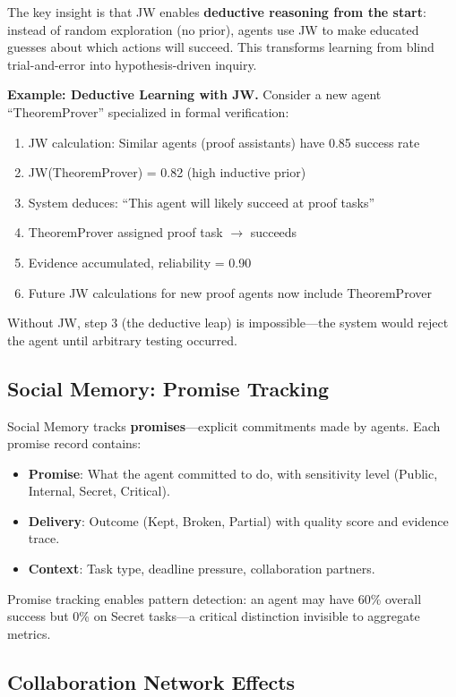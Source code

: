 \documentclass[11pt]{article}
\begin{document}
The key insight is that JW enables \textbf{deductive reasoning from the start}:
instead of random exploration (no prior), agents use JW to make educated guesses
about which actions will succeed. This transforms learning from blind trial-and-error
into hypothesis-driven inquiry.

\noindent\textbf{Example: Deductive Learning with JW.}
Consider a new agent ``TheoremProver'' specialized in formal verification:
\begin{enumerate}[noitemsep,topsep=2pt]
  \item JW calculation: Similar agents (proof assistants) have 0.85 success rate
  \item JW(TheoremProver) = 0.82 (high inductive prior)
  \item System deduces: ``This agent will likely succeed at proof tasks''
  \item TheoremProver assigned proof task $\rightarrow$ succeeds
  \item Evidence accumulated, reliability = 0.90
  \item Future JW calculations for new proof agents now include TheoremProver
\end{enumerate}
Without JW, step 3 (the deductive leap) is impossible---the system would reject
the agent until arbitrary testing occurred.

\subsection{Social Memory: Promise Tracking}

Social Memory tracks \textbf{promises}---explicit commitments made by agents.
Each promise record contains:
\begin{itemize}[noitemsep,topsep=4pt]
  \item \textbf{Promise}: What the agent committed to do, with sensitivity level
    (Public, Internal, Secret, Critical).
  \item \textbf{Delivery}: Outcome (Kept, Broken, Partial) with quality score and
    evidence trace.
  \item \textbf{Context}: Task type, deadline pressure, collaboration partners.
\end{itemize}

Promise tracking enables pattern detection: an agent may have 60\% overall
success but 0\% on Secret tasks---a critical distinction invisible to aggregate
metrics.

\subsection{Collaboration Network Effects}
\end{document}
